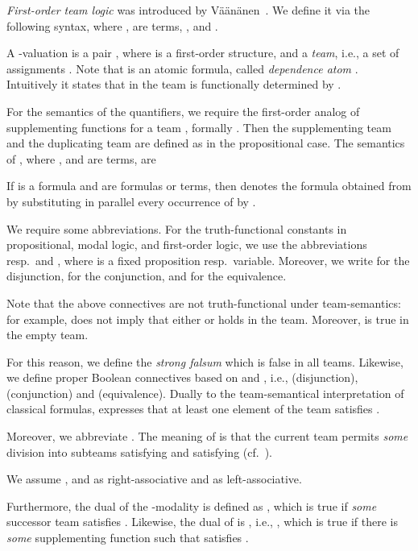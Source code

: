 \documentclass[a4paper,english,fleqn,11pt,final]{scrartcl}
\makeatletter
\newcommand{\ie}{i.e.\@\xspace}
\theoremstyle{plain}
\theoremstyle{definition}
\makeatother
\begin{document}
\smallskip

\emph{First-order team logic}  was introduced by Väänänen~\cite{vaananen_dependence_2007}.
We define it via the following syntax, where ,  are terms, , and .

A -valuation is a pair , where  is a first-order structure, and  a \emph{team}, \ie, a set of assignments .
Note that  is an atomic formula, called \emph{dependence atom} \cite{vaananen_dependence_2007}.
Intuitively it states that in the team  is functionally determined by .

For the semantics of the quantifiers, we require the first-order analog of supplementing functions  for a team , formally .
Then the supplementing team  and the duplicating team  are defined as in the propositional case.
The semantics of , where ,  and  are terms, are


\smallskip

If  is a formula and  are formulas or terms, then  denotes the formula obtained from  by substituting in parallel every occurrence of  by .


\medskip

We require some abbreviations.
For the truth-functional constants in propositional, modal logic, and first-order logic, we use the abbreviations  resp.\  and , where  is a fixed proposition resp.\ variable.
Moreover, we write  for the disjunction,  for the conjunction, and  for the equivalence.

Note that the above connectives are not truth-functional under team-semantics:
for example,  does not imply that either  or  holds in the team.
Moreover,  is true in the empty team.

For this reason, we define the \emph{strong falsum}  which is false in all teams.
Likewise, we define proper Boolean connectives based on  and , \ie,  (disjunction),  (conjunction) and  (equivalence).
Dually to the team-semantical interpretation of classical formulas,  expresses that at least one element of the team satisfies .

Moreover, we abbreviate .
The meaning of  is that the current team permits \emph{some} division into subteams  satisfying  and  satisfying  (cf.\ \cite{vaananen_dependence_2007,yang_propositional_2017}).

We assume ,  and  as right-associative and  as left-associative.

Furthermore, the dual of the -modality is defined as , which is true if \emph{some} successor team satisfies .
Likewise, the dual of  is , \ie, , which is true if there is \emph{some} supplementing function  such that  satisfies .
\end{document}
